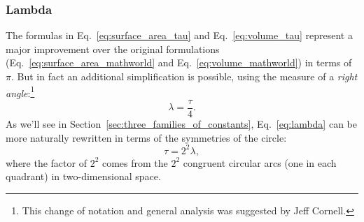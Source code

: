 {\subsubsection{Lambda} %
\label{sec:lambda}

The formulas in Eq.~\eqref{eq:surface_area_tau} and Eq.~\eqref{eq:volume_tau} represent a major improvement over the original formulations (Eq.~\eqref{eq:surface_area_mathworld} and Eq.~\eqref{eq:volume_mathworld}) in terms of $\pi$. But in fact an additional simplification is possible, using the measure of a \emph{right angle}:\footnote{This change of notation and general analysis was suggested by Jeff Cornell.}
\begin{equation}
\label{eq:lambda}
\lambda = \frac{\tau}{4}.
\end{equation}
As we'll see in Section~\ref{sec:three_families_of_constants}, Eq.~\eqref{eq:lambda} can be more naturally rewritten in terms of the symmetries of the circle:
\begin{equation}
\label{eq:tau_lambda}
\tau = 2^2 \lambda,
\end{equation}
where the factor of $2^2$ comes from the $2^2$ congruent circular arcs (one in each quadrant) in two-dimensional space.

}

